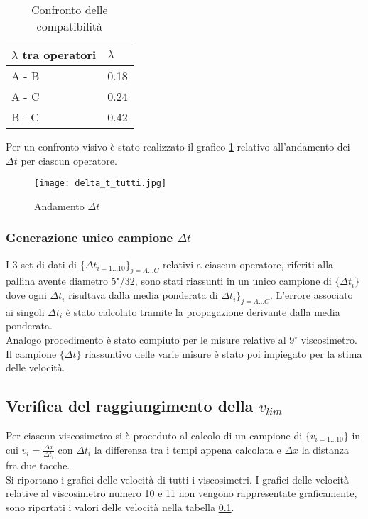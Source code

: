 \documentclass[a4paper,11pt,oneside]{article}
\begin{document}
\begin{table}[h]
\centering
\caption{Confronto delle compatibilità}
\label{tab:Confronto_tutte_le_compatibilità}
\begin{tabular}{|l|l|} 
\hline
\textbf{$\lambda$ tra operatori} & $\lambda$   \\ \hline

\rowcolor[rgb]{0.85,0.85,0.85} A - B & 0.18  \\ \hline
A - C & 0.24   \\ \hline
\rowcolor[rgb]{0.85,0.85,0.85} B - C & 0.42  \\ \hline
\end{tabular}
\end{table}


Per un confronto visivo è stato realizzato il grafico \ref{fig:andamento_delta_t} relativo all'andamento dei $\Delta t$ per ciascun operatore.

\begin{figure}[h!]
    \centering
    \texttt{[image: delta\_t\_tutti.jpg]}

    \caption{Andamento $\Delta t$}
    \label{fig:andamento_delta_t}
\end{figure}

\subsubsection*{Generazione unico campione $\Delta t$}
I 3 set di dati di $\{\Delta t_{i=1\dots10}\}_{j=A \dots C}$ relativi a ciascun operatore, riferiti alla pallina avente diametro 5"/32, sono stati riassunti in un unico campione di $\{\Delta t_{i}\}$ dove ogni $\Delta t_{i}$ risultava dalla media ponderata di $\Delta t_{i}\}_{j=A \dots C}$. L'errore associato ai singoli ${\Delta t_{i}}$ è stato calcolato tramite la propagazione derivante dalla media ponderata.\\

Analogo procedimento è stato compiuto per le misure relative al $9^{\circ}$ viscosimetro.
Il campione $\{\Delta t\}$ riassuntivo delle varie misure è stato poi impiegato per la stima delle velocità.


\subsection{Verifica del raggiungimento della $v_{lim}$}

Per ciascun viscosimetro si è proceduto al calcolo di un campione di $\{v_{i=1\dots 10}\}$ in cui $v_{i} = \frac{\Delta x}{\Delta t_i}$ con $\Delta t_i$ la differenza tra i tempi appena calcolata e $\Delta x$ la distanza fra due tacche.\\
Si riportano i grafici delle velocità di tutti i viscosimetri. I grafici delle velocità relative al viscosimetro numero 10 e 11 non vengono rappresentate graficamente, sono riportati i valori delle velocità nella tabella \ref{}.
\end{document}
